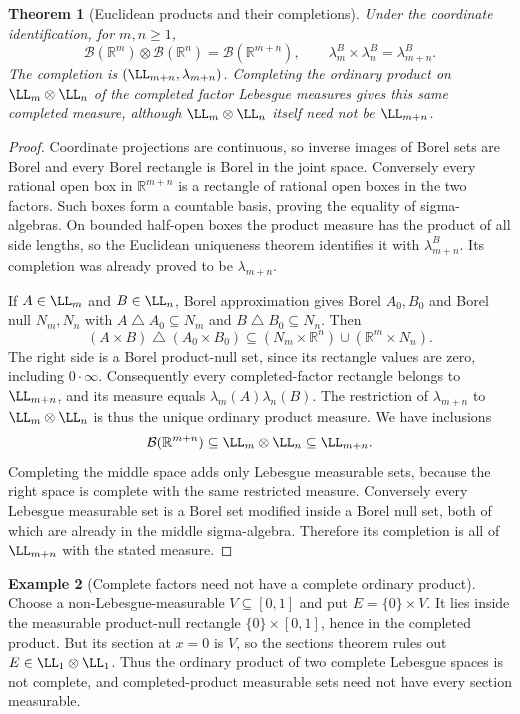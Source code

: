 \documentclass[11pt,oneside,openany]{book}
\newtheorem{theorem}{Theorem}[chapter]
\theoremstyle{definition}
\newtheorem{example}[theorem]{Example}
\theoremstyle{remark}
\newcommand{\R}{\mathbb R}\newcommand{\C}{\mathbb C}
\newcommand{\BB}{\mathcal B}\newcommand{\SSS}{\mathcal S}
\newcommand{\family}[1]{}
\begin{document}
\begin{theorem}[Euclidean products and their completions]
\family{D11.08.euclidean_product_completion}\label{d11:08:euclidean-product-completion}
Under the coordinate identification, for $m,n\geq1$,
\[
 \BB(\R^m)\otimes\BB(\R^n)=\BB(\R^{m+n}),\qquad
 \lambda_m^B\times\lambda_n^B=\lambda_{m+n}^B.
\]
The completion is $(\LL_{m+n},\lambda_{m+n})$.
Completing the ordinary product on $\LL_m\otimes\LL_n$ of the completed
factor Lebesgue measures gives this same completed measure, although
$\LL_m\otimes\LL_n$ itself need not be $\LL_{m+n}$.
\end{theorem}
\begin{proof}
Coordinate projections are continuous, so inverse images of Borel sets
are Borel and every Borel rectangle is Borel in the joint space.
Conversely every rational open box in $\R^{m+n}$ is a rectangle of
rational open boxes in the two factors. Such boxes form a countable
basis, proving the equality of sigma-algebras. On bounded half-open
boxes the product measure has the product of all side lengths, so the
Euclidean uniqueness theorem identifies it with $\lambda_{m+n}^B$.
Its completion was already proved to be $\lambda_{m+n}$.

If $A\in\LL_m$ and $B\in\LL_n$, Borel approximation gives Borel
$A_0,B_0$ and Borel null $N_m,N_n$ with
$A\mathbin\triangle A_0\subseteq N_m$ and
$B\mathbin\triangle B_0\subseteq N_n$. Then
\[
 (A\times B)\mathbin\triangle(A_0\times B_0)
 \subseteq(N_m\times\R^n)\cup(\R^m\times N_n).
\]
The right side is a Borel product-null set, since its rectangle values
are zero, including $0\cdot\infty$. Consequently every completed-factor
rectangle belongs to $\LL_{m+n}$, and its measure equals
$\lambda_m(A)\lambda_n(B)$. The restriction of $\lambda_{m+n}$ to
$\LL_m\otimes\LL_n$ is thus the unique ordinary product measure.
We have inclusions
\[
 \BB(\R^{m+n})\subseteq\LL_m\otimes\LL_n\subseteq\LL_{m+n}.
\]
Completing the middle space adds only Lebesgue measurable sets, because
the right space is complete with the same restricted measure. Conversely
every Lebesgue measurable set is a Borel set modified inside a Borel
null set, both of which are already in the middle sigma-algebra.
Therefore its completion is all of $\LL_{m+n}$ with the stated measure.
\end{proof}

\begin{example}[Complete factors need not have a complete ordinary product]
\family{D11.08.completion_sections_failure}\label{d11:08:completion-sections-failure}
Choose a non-Lebesgue-measurable $V\subseteq[0,1]$ and put
$E=\{0\}\times V$. It lies inside the measurable product-null rectangle
$\{0\}\times[0,1]$, hence in the completed product. But its section at
$x=0$ is $V$, so the sections theorem rules out
$E\in\LL_1\otimes\LL_1$. Thus the ordinary product of two complete
Lebesgue spaces is not complete, and completed-product measurable sets
need not have every section measurable.
\end{example}
\end{document}

